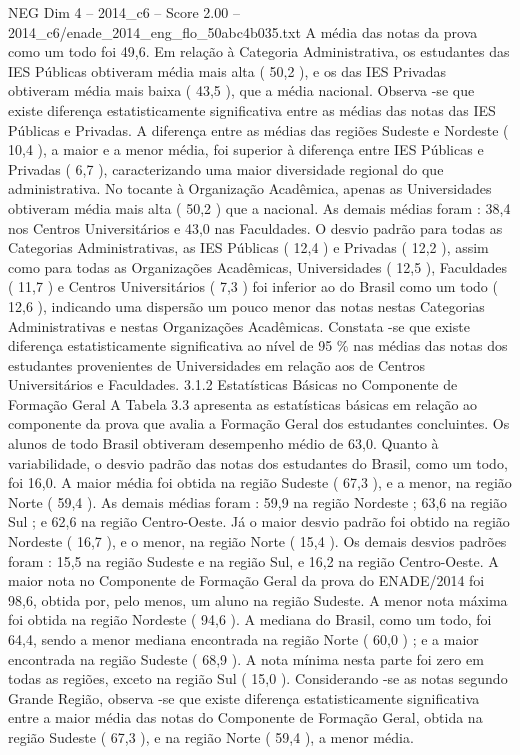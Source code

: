 \begin{textsample}{NEG Dim 4 – 2014\_c6 – Score 2.00 – 2014\_c6/enade\_2014\_eng\_flo\_50abc4b035.txt}
A média das notas da prova como um todo foi 49,6.
Em relação à Categoria Administrativa, os estudantes das IES Públicas obtiveram média mais alta ( 50,2 ), e os das IES Privadas obtiveram média mais baixa ( 43,5 ), que a média nacional.
Observa -se que existe diferença estatisticamente significativa entre as médias das notas das IES Públicas e Privadas.
A diferença entre as médias das regiões Sudeste e Nordeste ( 10,4 ), a maior e a menor média, foi superior à diferença entre IES Públicas e Privadas ( 6,7 ), caracterizando uma maior diversidade regional do que administrativa.
No tocante à Organização Acadêmica, apenas as Universidades obtiveram média mais alta ( 50,2 ) que a nacional.
As demais médias foram : 38,4 nos Centros Universitários e 43,0 nas Faculdades.
O desvio padrão para todas as Categorias Administrativas, as IES Públicas ( 12,4 ) e Privadas ( 12,2 ), assim como para todas as Organizações Acadêmicas, Universidades ( 12,5 ), Faculdades ( 11,7 ) e Centros Universitários ( 7,3 ) foi inferior ao do Brasil como um todo ( 12,6 ), indicando uma dispersão um pouco menor das notas nestas Categorias Administrativas e nestas Organizações Acadêmicas.
Constata -se que existe diferença estatisticamente significativa ao nível de 95 \% nas médias das notas dos estudantes provenientes de Universidades em relação aos de Centros Universitários e Faculdades. 3.1.2 Estatísticas Básicas no Componente de Formação Geral A Tabela 3.3 apresenta as estatísticas básicas em relação ao componente da prova que avalia a Formação Geral dos estudantes concluintes.
Os alunos de todo Brasil obtiveram desempenho médio de 63,0.
Quanto à variabilidade, o desvio padrão das notas dos estudantes do Brasil, como um todo, foi 16,0.
A maior média foi obtida na região Sudeste ( 67,3 ), e a menor, na região Norte ( 59,4 ).
As demais médias foram : 59,9 na região Nordeste ; 63,6 na região Sul ; e 62,6 na região Centro-Oeste.
Já o maior desvio padrão foi obtido na região Nordeste ( 16,7 ), e o menor, na região Norte ( 15,4 ).
Os demais desvios padrões foram : 15,5 na região Sudeste e na região Sul, e 16,2 na região Centro-Oeste.
A maior nota no Componente de Formação Geral da prova do ENADE/2014 foi 98,6, obtida por, pelo menos, um aluno na região Sudeste.
A menor nota máxima foi obtida na região Nordeste ( 94,6 ).
A mediana do Brasil, como um todo, foi 64,4, sendo a menor mediana encontrada na região Norte ( 60,0 ) ; e a maior encontrada na região Sudeste ( 68,9 ).
A nota mínima nesta parte foi zero em todas as regiões, exceto na região Sul ( 15,0 ).
Considerando -se as notas segundo Grande Região, observa -se que existe diferença estatisticamente significativa entre a maior média das notas do Componente de Formação Geral, obtida na região Sudeste ( 67,3 ), e na região Norte ( 59,4 ), a menor média.

\end{textsample}
